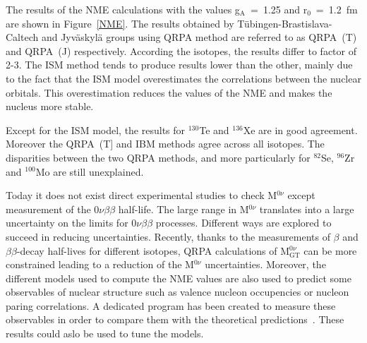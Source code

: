 \documentclass[main.tex]{subfiles}
\begin{document}
\bigskip


\NI The results of the NME calculations with the values g$_{\text{A}}$~=~1.25 and r$_0$~=~1.2~fm are shown in Figure~\ref{NME}. The results obtained by Tübingen-Brastislava-Caltech and Jyväskylä groups using QRPA method are referred to as QRPA~(T) and QRPA~(J) respectively. According the isotopes, the results differ to factor of 2-3. The ISM method tends to produce results lower than the other, mainly due to the fact that the ISM model overestimates the correlations between the nuclear orbitals. This overestimation reduces the values of the NME and makes the nucleus more stable. 


\bigskip


\NI Except for the ISM model, the results for $^{\text{130}}$Te and $^{\text{136}}$Xe are in good agreement. Moreover the QRPA~(T] and IBM methods agree across all isotopes. The disparities between the two QRPA methods, and more particularly for $^{\text{82}}$Se, $^{\text{96}}$Zr and $^{\text{100}}$Mo are still unexplained. 


\bigskip


\NI Today it does not exist direct experimental studies to check M$^{0\nu}$ except measurement of the 0$\nu\beta\beta$ half-life. The large range in M$^{0\nu}$ translates into a large uncertainty on the limits for 0$\nu\beta\beta$ processes. Different ways are explored to succeed in reducing uncertainties. Recently, thanks to the measurements of $\beta$ and $\beta\beta$-decay half-lives for different isotopes, QRPA calculations of M$_{\text{GT}}^{0\nu}$ can be more constrained leading to a reduction of the M$^{0\nu}$ uncertainties. Moreover, the different models used to compute the NME values are also used to predict some observables of nuclear structure such as valence nucleon occupencies or nucleon paring correlations. A dedicated program has been created to measure these observables in order to compare them with the theoretical predictions~\cite{ReduceNMEuncertainties}. These results could aslo be used to tune the models.  
\end{document}
